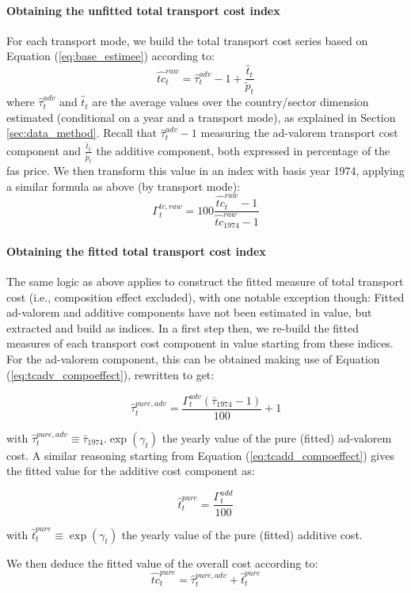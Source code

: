 \documentclass[a4paper,11pt]{article}
\begin{document}
\paragraph{Obtaining the unfitted total transport cost index} For each transport mode, we build the total transport cost series based on Equation (\ref{eq:base_estimee}) according to:
$$\widehat{tc}^{raw}_t= \widehat{\tau}^{adv}_t -1 + \frac{\widehat{t}_t}{\widetilde{p}_t}$$
\noindent where $\widehat{\tau}^{adv}_t$ and $\widehat{t}_t$ are the average values over the country/sector dimension estimated (conditional on a year and a transport mode), as explained in Section \ref{sec:data_method}.
Recall that $\widehat{\tau}^{adv}_t-1$ measuring the ad-valorem transport cost component and $\frac{\widehat{t}_t}{\widetilde{p}_t}$ the additive component, both expressed in percentage of the fas price.
We then transform this value in an index with basis year 1974, applying a similar formula as above (by transport mode):
$$\Gamma^{tc, raw}_t = 100\frac{\widehat{tc}^{raw}_t -1 }{\widehat{tc}^{raw}_{1974}-1}$$

\paragraph{Obtaining the fitted total transport cost index} The same logic as above applies to construct the fitted measure of total transport cost (i.e., composition effect excluded), with one notable exception though: Fitted ad-valorem and additive components have not been estimated in value, but extracted and build as indices.
In a first step then, we re-build the fitted measures of each transport cost component in value starting from these indices.
For the ad-valorem component, this can be obtained making use of Equation (\ref{eq:tcadv_compoeffect}), rewritten to get:

$$\widehat{\tau}^{pure, adv}_t = \frac{\Gamma^{adv}_t \left(\bar{\tau}_{1974}-1\right)}{100} +1$$

with $\widehat{\tau}^{pure, adv}_t \equiv \bar{\tau}_{1974}.\exp(\gamma_t)$ the yearly value of the pure (fitted) ad-valorem cost.
A similar reasoning starting from Equation (\ref{eq:tcadd_compoeffect}) gives the fitted value for the additive cost component as:

$$\widehat{t}^{pure}_t = \frac{\Gamma^{add}_t}{100}$$

with $\widehat{t}^{pure}_t \equiv \exp(\gamma_t)$ the yearly value of the pure (fitted) additive cost.


We then deduce the fitted value of the overall cost according to:
$$\widehat{tc}^{pure}_t= \widehat{\tau}^{pure, adv}_t  + \widehat{t}^{pure}_t$$
\end{document}

